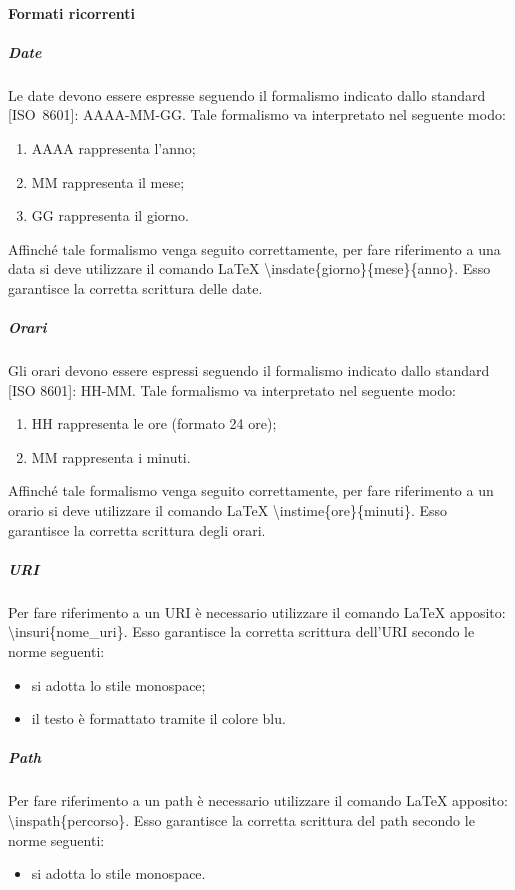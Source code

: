 			\paragraph{Formati ricorrenti} \label{sec:formatiricorrenti}
				\subparagraph{Date}
					Le date devono essere espresse seguendo il formalismo indicato dallo standard [ISO~8601]: AAAA-MM-GG. Tale formalismo va interpretato nel seguente modo:
					\begin{enumerate}
						\item AAAA rappresenta l’anno;
						\item MM rappresenta il mese;
						\item GG rappresenta il giorno.
					\end{enumerate}
					Affinché tale formalismo venga seguito correttamente, per fare riferimento a una data si deve utilizzare il comando \LaTeX{} \textbackslash insdate\{giorno\}\{mese\}\{anno\}. Esso garantisce la corretta scrittura delle date.
				\subparagraph{Orari}
					Gli orari devono essere espressi seguendo il formalismo indicato dallo standard [ISO 8601]: HH-MM. Tale formalismo va interpretato nel seguente modo:
					\begin{enumerate}
						\item HH rappresenta le ore (formato 24 ore);
						\item MM rappresenta i minuti.
					\end{enumerate}
					Affinché tale formalismo venga seguito correttamente, per fare riferimento a un orario si deve utilizzare il comando \LaTeX{} \textbackslash instime\{ore\}\{minuti\}. Esso garantisce la corretta scrittura degli orari.
				\subparagraph{URI}
					Per fare riferimento a un URI è necessario utilizzare il comando \LaTeX{} apposito: \textbackslash insuri\{nome\_uri\}. Esso garantisce la corretta scrittura dell'URI secondo le norme seguenti:
					\begin{itemize}
						\item si adotta lo stile monospace;
						\item il testo è formattato tramite il colore blu.
					\end{itemize}
				\subparagraph{Path}
					Per fare riferimento a un path è necessario utilizzare il comando \LaTeX{} apposito: \textbackslash inspath\{percorso\}. Esso garantisce la corretta scrittura del path secondo le norme seguenti:
					\begin{itemize}
						\item si adotta lo stile monospace.
					\end{itemize}
